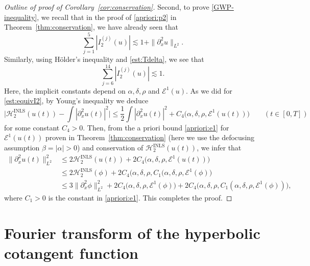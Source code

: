 \documentclass{amsart}
\numberwithin{equation}{section}
\begin{document}
\begin{proof}[Outline of proof of Corollary~\ref{cor:conservation}]
Second, to prove \eqref{GWP-inequality}, we recall that in the proof of \eqref{apriori:p2} in Theorem~\ref{thm:conservation}, we have already seen that 
\[ \sum_{j=1}^5 |I_2^{(j)}(u)|\lesssim 1+\| \partial_x^2u\|_{L^2}. \]
Similarly, using H\"older's inequality and \eqref{est:Tdelta}, we see that
\[ \sum_{j=6}^{14}|I_2^{(j)}(u)|\lesssim 1.\]
Here, the implicit constants depend on $\alpha,\delta,\rho$ and $\mathcal{E}^1(u)$.
As we did for \eqref{est:equivI2}, by Young's inequality we deduce
\[ \Big| \mathcal{H}_2^{\mathrm{INLS}}(u(t))-\int |\partial_x^2u(t)|^2\Big| \leq \frac12\int |\partial_x^2u(t)|^2 +C_4\big(\alpha,\delta,\rho,\mathcal{E}^1(u(t))\big)\qquad (t\in [0,T]) \]
for some constant $C_4>0$.
Then, from the a priori bound \eqref{apriori:e1} for $\mathcal{E}^1(u(t))$ proven in Theorem~\ref{thm:conservation} (here we use the defocusing assumption $\beta =|\alpha|>0$) and conservation of $\mathcal{H}_2^{\mathrm{INLS}}(u(t))$, we infer that
\begin{align*}
\| \partial_x^2u(t)\|_{L^2}^2&\leq 2\mathcal{H}_2^{\mathrm{INLS}}(u(t))+2C_4\big(\alpha,\delta,\rho,\mathcal{E}^1(u(t))\big) \\
&\leq 2\mathcal{H}_2^{\mathrm{INLS}}(\phi)+2C_4\big(\alpha,\delta,\rho,C_1(\alpha,\delta,\rho,\mathcal{E}^1(\phi)\big) \\
&\leq 3\|\partial_x^2\phi\|_{L^2}^2+2C_4\big(\alpha,\delta,\rho,\mathcal{E}^1(\phi)\big)+2C_4\big(\alpha,\delta,\rho,C_1(\alpha,\delta,\rho,\mathcal{E}^1(\phi))\big),
\end{align*}
where $C_1>0$ is the constant in \eqref{apriori:e1}.
This completes the proof.
\end{proof}




\appendix 

\section{Fourier transform of the hyperbolic cotangent function}
\label{app:Fourier}
\end{document}
